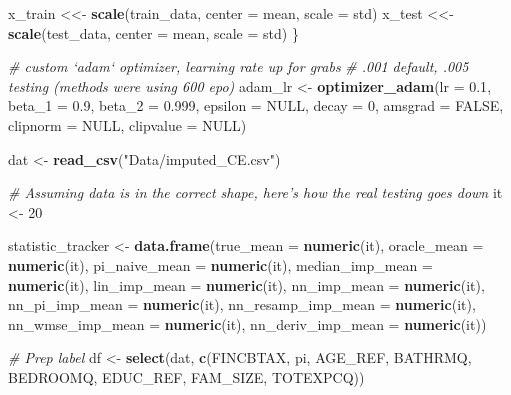 \documentclass[12pt,twoside]{reedthesis}
\newenvironment{Shaded}{\begin{snugshade}}{\end{snugshade}}
\newcommand{\KeywordTok}[1]{\textcolor[rgb]{0.13,0.29,0.53}{\textbf{#1}}}
\newcommand{\DataTypeTok}[1]{\textcolor[rgb]{0.13,0.29,0.53}{#1}}
\newcommand{\DecValTok}[1]{\textcolor[rgb]{0.00,0.00,0.81}{#1}}
\newcommand{\FloatTok}[1]{\textcolor[rgb]{0.00,0.00,0.81}{#1}}
\newcommand{\StringTok}[1]{\textcolor[rgb]{0.31,0.60,0.02}{#1}}
\newcommand{\CommentTok}[1]{\textcolor[rgb]{0.56,0.35,0.01}{\textit{#1}}}
\newcommand{\OtherTok}[1]{\textcolor[rgb]{0.56,0.35,0.01}{#1}}
\newcommand{\NormalTok}[1]{#1}
\begin{document}
\begin{Shaded}
\begin{Highlighting}[]
\NormalTok{  x_train <<-}\StringTok{ }\KeywordTok{scale}\NormalTok{(train_data, }\DataTypeTok{center =}\NormalTok{ mean, }\DataTypeTok{scale =}\NormalTok{ std)}
\NormalTok{  x_test <<-}\StringTok{ }\KeywordTok{scale}\NormalTok{(test_data, }\DataTypeTok{center =}\NormalTok{ mean, }\DataTypeTok{scale =}\NormalTok{ std)}
\NormalTok{\}}

\CommentTok{# custom `adam` optimizer, learning rate up for grabs}
\CommentTok{# .001 default, .005 testing (methods were using 600 epo)}
\NormalTok{adam_lr <-}\StringTok{ }\KeywordTok{optimizer_adam}\NormalTok{(}\DataTypeTok{lr =} \FloatTok{0.1}\NormalTok{, }\DataTypeTok{beta_1 =} \FloatTok{0.9}\NormalTok{, }\DataTypeTok{beta_2 =} \FloatTok{0.999}\NormalTok{,}
                          \DataTypeTok{epsilon =} \OtherTok{NULL}\NormalTok{, }\DataTypeTok{decay =} \DecValTok{0}\NormalTok{, }\DataTypeTok{amsgrad =} \OtherTok{FALSE}\NormalTok{, }\DataTypeTok{clipnorm =} \OtherTok{NULL}\NormalTok{,}
                          \DataTypeTok{clipvalue =} \OtherTok{NULL}\NormalTok{)}

\NormalTok{dat <-}\StringTok{ }\KeywordTok{read_csv}\NormalTok{(}\StringTok{"Data/imputed_CE.csv"}\NormalTok{)}

\CommentTok{# Assuming data is in the correct shape, here's how the real testing goes down}
\NormalTok{it <-}\StringTok{ }\DecValTok{20}

\NormalTok{statistic_tracker <-}\StringTok{ }\KeywordTok{data.frame}\NormalTok{(}\DataTypeTok{true_mean =} \KeywordTok{numeric}\NormalTok{(it), }
                                \DataTypeTok{oracle_mean =} \KeywordTok{numeric}\NormalTok{(it),}
                                \DataTypeTok{pi_naive_mean =} \KeywordTok{numeric}\NormalTok{(it),}
                                \DataTypeTok{median_imp_mean =} \KeywordTok{numeric}\NormalTok{(it),}
                                \DataTypeTok{lin_imp_mean =} \KeywordTok{numeric}\NormalTok{(it),}
                                \DataTypeTok{nn_imp_mean =} \KeywordTok{numeric}\NormalTok{(it),}
                                \DataTypeTok{nn_pi_imp_mean =} \KeywordTok{numeric}\NormalTok{(it),}
                                \DataTypeTok{nn_resamp_imp_mean =} \KeywordTok{numeric}\NormalTok{(it),}
                                \DataTypeTok{nn_wmse_imp_mean =} \KeywordTok{numeric}\NormalTok{(it),}
                                \DataTypeTok{nn_deriv_imp_mean =} \KeywordTok{numeric}\NormalTok{(it))}

\CommentTok{# Prep label}
\NormalTok{df <-}\StringTok{ }\KeywordTok{select}\NormalTok{(dat, }\KeywordTok{c}\NormalTok{(FINCBTAX, pi, AGE_REF, BATHRMQ, BEDROOMQ, EDUC_REF, FAM_SIZE,}
\NormalTok{                    TOTEXPCQ))}


\end{Highlighting}
\end{Shaded}
\end{document}
